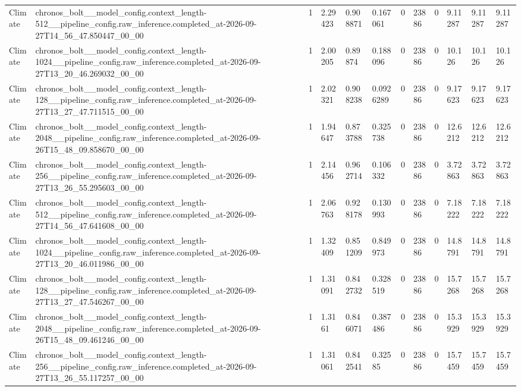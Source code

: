 \begin{tabular}{llllllllllll}
Climate & chronos\_bolt\_\_model\_config.context\_length-512\_\_pipeline\_config.raw\_inference.completed\_at-2026-09-27T14\_56\_47.850447\_00\_00 & 1 & 2.29423 & 0.908871 & 0.167061 & 0 & 23886 & 0 & 9.11287 & 9.11287 & 9.11287 \\
Climate & chronos\_bolt\_\_model\_config.context\_length-1024\_\_pipeline\_config.raw\_inference.completed\_at-2026-09-27T13\_20\_46.269032\_00\_00 & 1 & 2.00205 & 0.89874 & 0.188096 & 0 & 23886 & 0 & 10.126 & 10.126 & 10.126 \\
Climate & chronos\_bolt\_\_model\_config.context\_length-128\_\_pipeline\_config.raw\_inference.completed\_at-2026-09-27T13\_27\_47.711515\_00\_00 & 1 & 2.02321 & 0.908238 & 0.0926289 & 0 & 23886 & 0 & 9.17623 & 9.17623 & 9.17623 \\
Climate & chronos\_bolt\_\_model\_config.context\_length-2048\_\_pipeline\_config.raw\_inference.completed\_at-2026-09-26T15\_48\_09.858670\_00\_00 & 1 & 1.94647 & 0.873788 & 0.325738 & 0 & 23886 & 0 & 12.6212 & 12.6212 & 12.6212 \\
Climate & chronos\_bolt\_\_model\_config.context\_length-256\_\_pipeline\_config.raw\_inference.completed\_at-2026-09-27T13\_26\_55.295603\_00\_00 & 1 & 2.14456 & 0.962714 & 0.106332 & 0 & 23886 & 0 & 3.72863 & 3.72863 & 3.72863 \\
Climate & chronos\_bolt\_\_model\_config.context\_length-512\_\_pipeline\_config.raw\_inference.completed\_at-2026-09-27T14\_56\_47.641608\_00\_00 & 1 & 2.06763 & 0.928178 & 0.130993 & 0 & 23886 & 0 & 7.18222 & 7.18222 & 7.18222 \\
Climate & chronos\_bolt\_\_model\_config.context\_length-1024\_\_pipeline\_config.raw\_inference.completed\_at-2026-09-27T13\_20\_46.011986\_00\_00 & 1 & 1.32409 & 0.851209 & 0.849973 & 0 & 23886 & 0 & 14.8791 & 14.8791 & 14.8791 \\
Climate & chronos\_bolt\_\_model\_config.context\_length-128\_\_pipeline\_config.raw\_inference.completed\_at-2026-09-27T13\_27\_47.546267\_00\_00 & 1 & 1.31091 & 0.842732 & 0.328519 & 0 & 23886 & 0 & 15.7268 & 15.7268 & 15.7268 \\
Climate & chronos\_bolt\_\_model\_config.context\_length-2048\_\_pipeline\_config.raw\_inference.completed\_at-2026-09-26T15\_48\_09.461246\_00\_00 & 1 & 1.3161 & 0.846071 & 0.387486 & 0 & 23886 & 0 & 15.3929 & 15.3929 & 15.3929 \\
Climate & chronos\_bolt\_\_model\_config.context\_length-256\_\_pipeline\_config.raw\_inference.completed\_at-2026-09-27T13\_26\_55.117257\_00\_00 & 1 & 1.31061 & 0.842541 & 0.32585 & 0 & 23886 & 0 & 15.7459 & 15.7459 & 15.7459 \\

\end{tabular}
